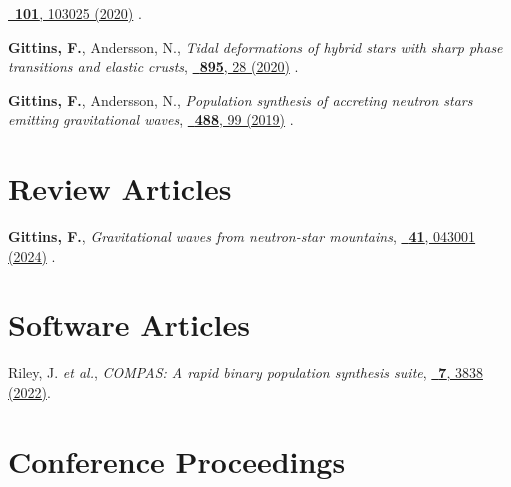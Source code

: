 \begin{etaremune}[start=\value{pubCounter}]
    \href{https://doi.org/10.1103/PhysRevD.101.103025}%
    {\prd\ \textbf{101}, 103025 (2020)}
    .
    \item \textbf{Gittins, F.}, Andersson, N.,
    \textit{Tidal deformations of hybrid stars with sharp phase transitions and
    elastic crusts},
    \href{https://doi.org/10.3847/1538-4357/ab8aca}%
    {\apj\ \textbf{895}, 28 (2020)}
    .
    \item \textbf{Gittins, F.}, Andersson, N.,
    \textit{Population synthesis of accreting neutron stars emitting
    gravitational waves},
    \href{https://doi.org/10.1093/mnras/stz1719}%
    {\mnras\ \textbf{488}, 99 (2019)}
    .
%
    \setcounter{pubCounter}{\value{enumi}}
\end{etaremune}

\section{Review Articles}

\secstartswithlist{}%
\addtocounter{pubCounter}{-1}%
\begin{etaremune}[start=\value{pubCounter}]
    \item \textbf{Gittins, F.},
    \textit{Gravitational waves from neutron-star mountains},
    \href{https://doi.org/10.1088/1361-6382/ad1c35}%
    {\cqg\ \textbf{41}, 043001 (2024)}
    .
%
    \setcounter{pubCounter}{\value{enumi}}
\end{etaremune}

\section{Software Articles}

\secstartswithlist{}%
\addtocounter{pubCounter}{-1}%
\begin{etaremune}[start=\value{pubCounter}]
    \item Riley, J. \textit{et al.},
    \textit{COMPAS: A rapid binary population synthesis suite},
    \href{https://doi.org/10.21105/joss.03838}%
    {\joss\ \textbf{7}, 3838 (2022)}.
%
    \setcounter{pubCounter}{\value{enumi}}
\end{etaremune}

\section{Conference Proceedings}

